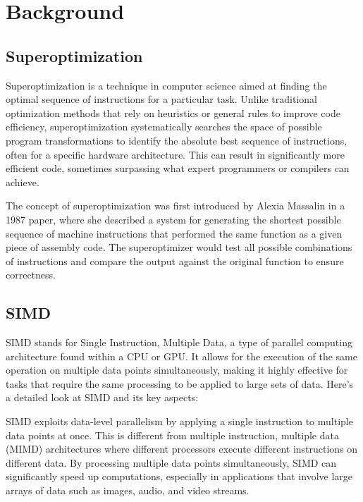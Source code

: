 
\chapter{Background}
\label{chap:background}


\section{Superoptimization}
\label{sec:superoptimization}


Superoptimization is a technique in computer science aimed at finding
the optimal sequence of instructions for a particular task. Unlike
traditional optimization methods that rely on heuristics or general
rules to improve code efficiency, superoptimization systematically
searches the space of possible program transformations to identify the
absolute best sequence of instructions, often for a specific hardware
architecture. This can result in significantly more efficient code,
sometimes surpassing what expert programmers or compilers can achieve.


The concept of superoptimization was first introduced by Alexia
Massalin in a 1987 paper, where she described a system for generating
the shortest possible sequence of machine instructions that performed
the same function as a given piece of assembly code. The
superoptimizer would test all possible combinations of instructions
and compare the output against the original function to ensure
correctness.

\section{SIMD}
\label{sec:simd}

SIMD stands for Single Instruction, Multiple Data, a type of parallel
computing architecture found within a CPU or GPU. It allows for the
execution of the same operation on multiple data points
simultaneously, making it highly effective for tasks that require the
same processing to be applied to large sets of data. Here's a detailed
look at SIMD and its key aspects:


SIMD exploits data-level parallelism by applying a single instruction
to multiple data points at once. This is different from multiple
instruction, multiple data (MIMD) architectures where different
processors execute different instructions on different data. By
processing multiple data points simultaneously, SIMD can significantly
speed up computations, especially in applications that involve large
arrays of data such as images, audio, and video streams.

